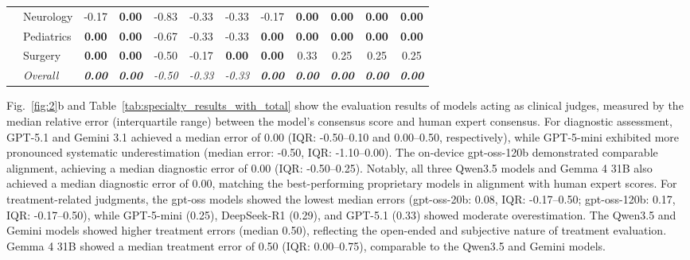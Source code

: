 \documentclass[10pt,journal,compsoc, onecolumn]{IEEEtran}
\newcommand{\best}[1]{\textbf{#1}}
\begin{document}
\begin{table}[!htbp]
\begin{tabular}{ll ccc @{\hskip 6pt} c @{\hskip 6pt} cc @{\hskip 6pt} ccc @{\hskip 6pt} c}
& Neurology & -0.17 & \best{0.00} & -0.83 & -0.33 & -0.33 & -0.17 & \best{0.00} & \best{0.00} & \best{0.00} & \best{0.00} \\
& Pediatrics & \best{0.00} & \best{0.00} & -0.67 & -0.33 & -0.33 & \best{0.00} & \best{0.00} & \best{0.00} & \best{0.00} & \best{0.00} \\
& Surgery & \best{0.00} & \best{0.00} & -0.50 & -0.17 & \best{0.00} & \best{0.00} & 0.33 & 0.25 & 0.25 & 0.25 \\
\cmidrule{2-12}
& \textit{Overall} & \textit{\best{0.00}} & \textit{\best{0.00}} & \textit{-0.50} & \textit{-0.33} & \textit{-0.33} & \textit{\best{0.00}} & \textit{\best{0.00}} & \textit{\best{0.00}} & \textit{\best{0.00}} & \textit{\best{0.00}} \\
\bottomrule
\end{tabular}
\end{table}

Fig.~\ref{fig:2}b and Table~\ref{tab:specialty_results_with_total} show the evaluation results of models acting as clinical judges, measured by the median relative error (interquartile range) between the model's consensus score and human expert consensus. For diagnostic assessment, GPT-5.1 and Gemini 3.1 achieved a median error of 0.00 (IQR: -0.50--0.10 and 0.00--0.50, respectively), while GPT-5-mini exhibited more pronounced systematic underestimation (median error: -0.50, IQR: -1.10--0.00). The on-device gpt-oss-120b demonstrated comparable alignment, achieving a median diagnostic error of 0.00 (IQR: -0.50--0.25). Notably, all three Qwen3.5 models and Gemma 4 31B also achieved a median diagnostic error of 0.00, matching the best-performing proprietary models in alignment with human expert scores. For treatment-related judgments, the gpt-oss models showed the lowest median errors (gpt-oss-20b: 0.08, IQR: -0.17--0.50; gpt-oss-120b: 0.17, IQR: -0.17--0.50), while GPT-5-mini (0.25), DeepSeek-R1 (0.29), and GPT-5.1 (0.33) showed moderate overestimation. The Qwen3.5 and Gemini models showed higher treatment errors (median 0.50), reflecting the open-ended and subjective nature of treatment evaluation. Gemma 4 31B showed a median treatment error of 0.50 (IQR: 0.00--0.75), comparable to the Qwen3.5 and Gemini models.
\end{document}
